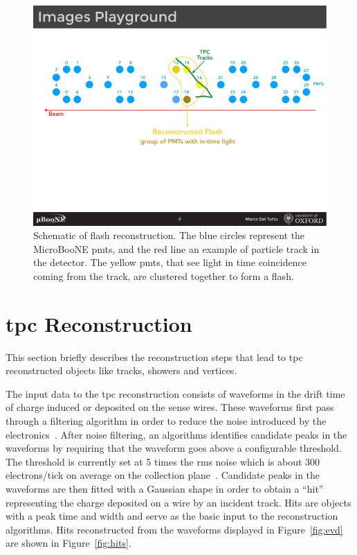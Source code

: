 \begin{figure}[]
\centering
\includegraphics[width=1.00\textwidth]{images/Reconstruction/flash_2}
\caption[Flash Reconstruction]{Schematic of flash reconstruction. The blue circles represent the MicroBooNE \acrshort{pmt}s, and the red line an example of particle track in the detector. The yellow \acrshort{pmt}s, that see light in time coincidence coming from the track, are clustered together to form a flash. }
\label{fig:flash}
\end{figure}












\section{\acrshort{tpc} Reconstruction}
\label{sec:tpc_reco}

This section briefly describes the reconstruction steps that lead to \acrshort{tpc} reconstructed objects like tracks, showers and vertices. 

The input data to the \acrshort{tpc} reconstruction consists of waveforms in the drift time of charge induced or deposited on the sense wires. 
These waveforms first pass through a filtering algorithm in order to reduce the noise introduced by the electronics~\cite{noise_paper}. 
After noise filtering, an algorithms identifies candidate peaks in the waveforms by requiring that the waveform goes above a configurable threshold. The threshold is currently set at 5 times the \acrshort{rms} noise which is about 300 electrons/tick on average on the collection plane~\cite{signal_paper_i, signal_paper_ii}. Candidate peaks in the waveforms are then fitted with a Gaussian shape in order to obtain a ``hit'' representing the charge deposited on a wire by an incident track. Hits are objects with a peak time and width and serve as the basic input to the reconstruction algorithms. Hits reconstructed from the waveforms displayed in Figure~\ref{fig:evd} are shown in Figure~\ref{fig:hits}.

